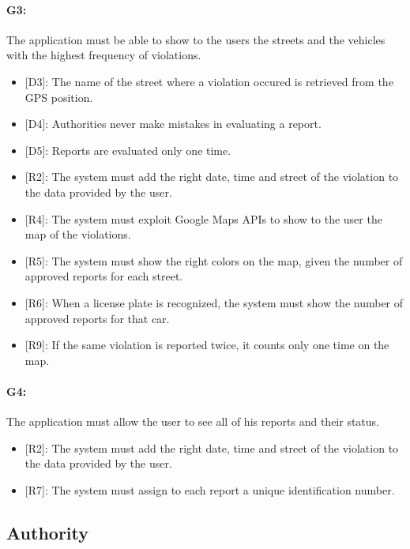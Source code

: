\documentclass[12pt,a4paper]{report}
\begin{document}
			\paragraph {G3:} The application must be able to show to the users the streets and the vehicles with the highest frequency of violations.
			\begin{itemize}
				\item{[D3]:} The name of the street where a violation occured is retrieved from the GPS position.
				\item{[D4]:} Authorities never make mistakes in evaluating a report.
				\item{[D5]:} Reports are evaluated only one time.
			\end{itemize}
			\begin{itemize}
				\item{[R2]:} The system must add the right date, time and street of the violation to the data provided by the user.
				\item{[R4]:} The system must exploit Google Maps APIs to show to the user the map of the violations.
				\item{[R5]:} The system must show the right colors on the map, given the number of approved reports for each street.
				\item{[R6]:} When a license plate is recognized, the system must show the number of approved reports for that car.
				\item{[R9]:} If the same violation is reported twice, it counts only one time on the map.
			\end{itemize}
				\paragraph {G4:}  The application must allow the user to see all of his reports and their status.
			\begin{itemize}
				\item{[R2]:} The system must add the right date, time and street of the violation to the data provided by the user.
				\item{[R7]:} The system must assign to each report a unique identification number.
			\end{itemize}

		\subsection{Authority}
\end{document}
